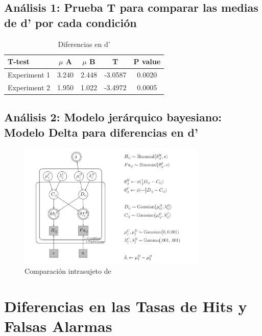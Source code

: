 \subsection{Análisis 1: Prueba T para comparar las medias de d' por cada condición}

\begin{table}
\caption[Prueba T]{Diferencias en d'}
\label{Tabla_t-HitsyFA}
\centering
\begin{tabular}{l | c c c c}
\toprule
\textbf{T-test} & \textbf{$\mu$ A} & \textbf{$\mu$ B} & \textbf{T}  & \textbf{P value}\\
\midrule
Experiment 1 & 3.240 & 2.448 & -3.0587 & 0.0020 \\
Experiment 2 & 1.950 & 1.022 & -3.4972 & 0.0005 \\
\bottomrule
\end{tabular}
\end{table}


\subsection{Análisis 2: Modelo jerárquico bayesiano: Modelo Delta para diferencias en d'}

\begin{figure}[th]
\centering
\includegraphics[width=0.80\textwidth]{Figures/Model_Delta_Diff_D}
\caption[Diferencias en Tasas (Comprobando diferencias entre condiciones)]{Comparación intrasujeto de}
\label{fig:Mod_Delta}
\end{figure}



\section{Diferencias en las Tasas de Hits y Falsas Alarmas}

